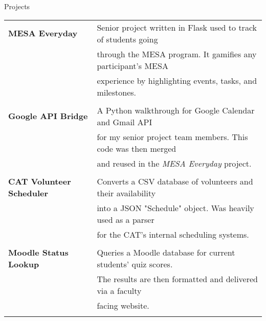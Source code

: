 \documentclass{resume} %
\begin{document}
\begin{rSection}{Projects}

\begin{tabular}{ @{} >{\bfseries}l @{\quad\quad}l }

MESA Everyday
    & Senior project written in Flask used to track of students going \\
    & through the MESA program. It gamifies any participant's MESA \\
    & experience by highlighting events, tasks, and milestones. \\
    & \\
    
Google API Bridge 
    & A Python walkthrough for Google Calendar and Gmail API \\
    & for my senior project team members. This code was then merged \\
    & and reused in the \textit{MESA Everyday} project. \\
    & \\
    
CAT Volunteer Scheduler 
    & Converts a CSV database of volunteers and their availability \\
    & into a JSON "Schedule" object. Was heavily used as a parser \\
    & for the CAT's internal scheduling systems. \\
    & \\
    
Moodle Status Lookup
    & Queries a Moodle database for current students' quiz scores. \\
    & The results are then formatted and delivered via a faculty \\ 
    & facing website. \\
    & \\
    
\end{tabular}

\end{rSection}

\end{document}
